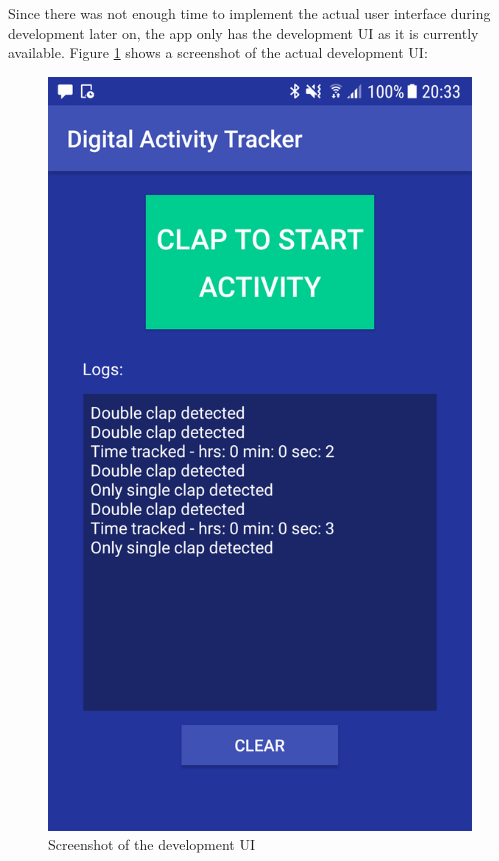 Since there was not enough time to implement the actual user interface during development later on, the app only has the development UI as it is currently available. Figure \ref{ui-screenshot} shows a screenshot of the actual development UI:
\begin{figure}[H]
	\centering
	\includegraphics[width=0.5\linewidth]{./imgs/uiScreenshot.png}
	\caption{Screenshot of the development UI}
	\label{ui-screenshot}
\end{figure}